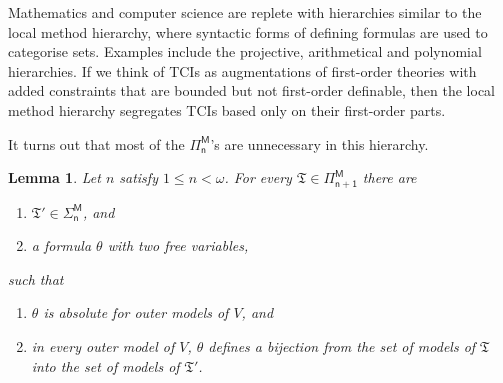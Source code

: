 \documentclass[12pt, twoside]{memoir}
\numberwithin{equation}{section}
\newtheorem{lem}[thm]{Lemma}
\theoremstyle{definition}
\theoremstyle{remark}
\theoremstyle{definition}
\theoremstyle{definition}
\theoremstyle{definition}
\theoremstyle{remark}
\begin{document}
Mathematics and computer science are replete with hierarchies similar to the local method hierarchy, where syntactic forms of defining formulas are used to categorise sets. Examples include the projective, arithmetical and polynomial hierarchies. If we think of TCIs as augmentations of first-order theories with added constraints that are bounded but not first-order definable, then the local method hierarchy segregates TCIs based only on their first-order parts.

It turns out that most of the $\mathsf{\Pi^M_n}$'s are unnecessary in this hierarchy. 

\begin{lem}\label{prop252'}
Let $n$ satisfy $1 \leq n < \omega$. For every $\mathfrak{T} \in \mathsf{\Pi^M_{n+1}}$ there are
\begin{enumerate}[label=(\arabic*)]
    \item $\mathfrak{T}' \in \mathsf{\Sigma^M_n}$, and
    \item a formula $\theta$ with two free variables,
\end{enumerate}
such that 
\begin{enumerate}[label=(\alph*)]
    \item $\theta$ is absolute for outer models of $V$, and
    \item in every outer model of $V$, $\theta$ defines a bijection from the set of models of $\mathfrak{T}$ into the set of models of $\mathfrak{T}'$.
\end{enumerate}
\end{lem}
\end{document}
